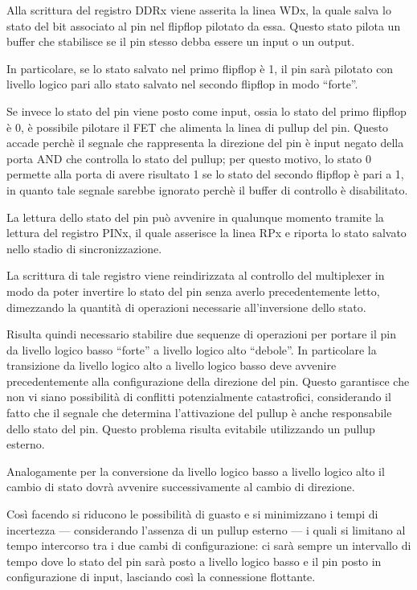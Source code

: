 Alla scrittura del registro DDRx viene asserita la linea WDx, la quale salva lo stato del bit associato al pin nel flipflop pilotato da essa. Questo stato pilota un buffer che stabilisce se il pin stesso debba essere un input o un output.

In particolare, se lo stato salvato nel primo flipflop è 1, il pin sarà pilotato con livello logico pari allo stato salvato nel secondo flipflop in modo ``forte''.

Se invece lo stato del pin viene posto come input, ossia lo stato del primo flipflop è 0, è possibile pilotare il FET che alimenta la linea di pullup del pin. Questo accade perchè il segnale che rappresenta la direzione del pin è input negato della porta AND che controlla lo stato del pullup; per questo motivo, lo stato 0 permette alla porta di avere risultato 1 se lo stato del secondo flipflop è pari a 1, in quanto tale segnale sarebbe ignorato perchè il buffer di controllo è disabilitato.

La lettura dello stato del pin può avvenire in qualunque momento tramite la lettura del registro PINx, il quale asserisce la linea RPx e riporta lo stato salvato nello stadio di sincronizzazione.

La scrittura di tale registro viene reindirizzata al controllo del multiplexer in modo da poter invertire lo stato del pin senza averlo precedentemente letto, dimezzando la quantità di operazioni necessarie all'inversione dello stato.

Risulta quindi necessario stabilire due sequenze di operazioni per portare il pin da livello logico basso ``forte'' a livello logico alto ``debole''. In particolare la transizione da livello logico alto a livello logico basso deve avvenire precedentemente alla configurazione della direzione del pin. Questo garantisce che non vi siano possibilità di conflitti potenzialmente catastrofici, considerando il fatto che il segnale che determina l'attivazione del pullup è anche responsabile dello stato del pin. Questo problema risulta evitabile utilizzando un pullup esterno.

Analogamente per la conversione da livello logico basso a livello logico alto il cambio di stato dovrà avvenire successivamente al cambio di direzione.

Così facendo si riducono le possibilità di guasto e si minimizzano i tempi di incertezza --- considerando l'assenza di un pullup esterno --- i quali si limitano al tempo intercorso tra i due cambi di configurazione: ci sarà sempre un intervallo di tempo dove lo stato del pin sarà posto a livello logico basso e il pin posto in configurazione di input, lasciando così la connessione flottante.

